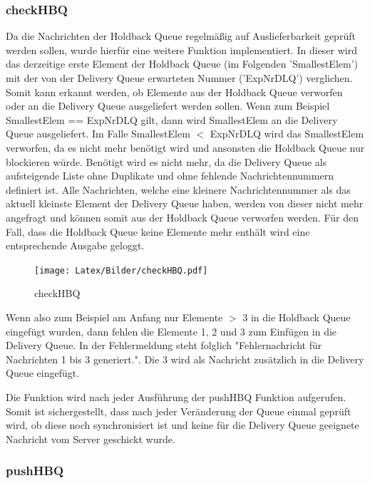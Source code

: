 \subsubsection{checkHBQ} \label{checkHBQ}

Da die Nachrichten der Holdback Queue regelmäßig auf Auslieferbarkeit geprüft werden sollen, wurde hierfür eine weitere Funktion implementiert. 
In dieser wird das derzeitige erste Element der Holdback Queue (im Folgenden 'SmallestElem')  mit der von der Delivery Queue erwarteten Nummer ('ExpNrDLQ') verglichen. 
Somit kann erkannt werden, ob Elemente aus der Holdback Queue verworfen oder an die Delivery Queue ausgeliefert werden sollen. 
Wenn zum Beispiel SmallestElem == ExpNrDLQ gilt, dann wird SmallestElem an die Delivery Queue ausgeliefert. Im Falle SmallestElem $<$ ExpNrDLQ wird das SmallestElem verworfen, da es nicht mehr benötigt wird und ansonsten die Holdback Queue nur blockieren würde. Benötigt wird es nicht mehr, da die Delivery Queue als aufsteigende Liste ohne Duplikate und ohne fehlende Nachrichtennummern definiert ist. Alle Nachrichten, welche eine kleinere Nachrichtennummer als das aktuell kleinste Element der Delivery Queue haben, werden von dieser nicht mehr angefragt und können somit aus der Holdback Queue verworfen werden.  
Für den Fall, dass die Holdback Queue keine Elemente mehr enthält wird eine entsprechende Ausgabe geloggt. 

\begin{figure}[htbp]
\begin{center}
\texttt{[image: Latex/Bilder/checkHBQ.pdf]}
\caption{checkHBQ}\label{fig:checkHBQ}
\end{center}
\end{figure}

Wenn also zum Beispiel am Anfang nur Elemente $>$ 3 in die Holdback Queue eingefügt wurden, dann fehlen die Elemente 1, 2 und 3 zum Einfügen in die Delivery Queue. In der Fehlermeldung steht folglich "Fehlernachricht für Nachrichten 1 bis 3 generiert.". Die 3 wird als Nachricht zusätzlich in die Delivery Queue eingefügt.

Die Funktion wird nach jeder Ausführung der pushHBQ Funktion aufgerufen. Somit ist sichergestellt, dass nach jeder Veränderung der Queue einmal geprüft wird, ob diese noch synchronisiert ist und keine für die Delivery Queue geeignete Nachricht vom Server geschickt wurde.

\subsubsection{pushHBQ} 

